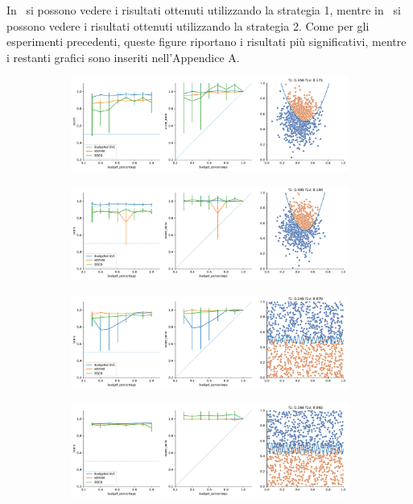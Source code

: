 In~ si possono vedere i risultati ottenuti utilizzando la strategia 1, mentre in~ si possono vedere i risultati ottenuti utilizzando la strategia 2.
Come per gli esperimenti precedenti, queste figure riportano i risultati più significativi, mentre i restanti grafici sono inseriti nell'Appendice A.
\begin{figure}
    \begin{subfigure}{.5\textwidth}
        \centering
        \includegraphics[width=\textwidth]{img/comp_old/3.pdf}
    \end{subfigure}%
    \begin{subfigure}{.5\textwidth}
        \centering
        \includegraphics[width=\textwidth]{img/comp_old/4.pdf}
    \end{subfigure}
    \hfill
    \begin{subfigure}{.5\textwidth}
        \centering
        \includegraphics[width=\textwidth]{img/comp_old/8.pdf}
    \end{subfigure}
    \begin{subfigure}{.5\textwidth}
        \centering
        \includegraphics[width=\textwidth]{img/comp_old/9.pdf}

\end{subfigure}
\end{figure}
